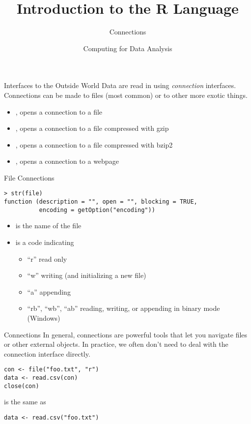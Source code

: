 \documentclass[aspectratio=169]{beamer}
\title[The R Language]{Introduction to the R Language}
\subtitle{Connections}
\date{Computing for Data Analysis}
\begin{document}
\begin{frame}
  \titlepage
\end{frame}


\begin{frame}{Interfaces to the Outside World}
Data are read in using \textit{connection} interfaces.  Connections
can be made to files (most common) or to other more exotic things.
\begin{itemize}
\item
{}, opens a connection to a file
\item
{}, opens a connection to a file compressed with gzip
\item
{}, opens a connection to a file compressed with bzip2
\item
{}, opens a connection to a webpage
\end{itemize}
\end{frame}


\begin{frame}[fragile]{File Connections}
\begin{verbatim}
> str(file)
function (description = "", open = "", blocking = TRUE, 
          encoding = getOption("encoding"))
\end{verbatim}
\begin{itemize}
\item
{} is the name of the file
\item
{} is a code indicating
\begin{itemize}
\item
``r'' read only
\item
``w'' writing (and initializing a new file)
\item
``a'' appending
\item
``rb'', ``wb'', ``ab'' reading, writing, or appending in binary mode
(Windows)
\end{itemize}
\end{itemize}
\end{frame}


\begin{frame}[fragile]{Connections}
In general, connections are powerful tools that let you navigate files
or other external objects.  In practice, we often don't need to deal
with the connection interface directly.
\begin{verbatim}
con <- file("foo.txt", "r")
data <- read.csv(con)
close(con)
\end{verbatim}
is the same as
\begin{verbatim}
data <- read.csv("foo.txt")
\end{verbatim}
\end{frame}
\end{document}
